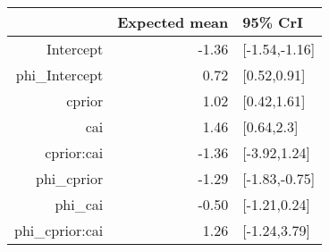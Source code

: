 \begin{tabular}{rrl}
  \hline
 & Expected mean & 95\% CrI \\ 
  \hline
Intercept & -1.36 & [-1.54,-1.16] \\ 
  phi\_Intercept & 0.72 & [0.52,0.91] \\ 
  cprior & 1.02 & [0.42,1.61] \\ 
  cai & 1.46 & [0.64,2.3] \\ 
  cprior:cai & -1.36 & [-3.92,1.24] \\ 
  phi\_cprior & -1.29 & [-1.83,-0.75] \\ 
  phi\_cai & -0.50 & [-1.21,0.24] \\ 
  phi\_cprior:cai & 1.26 & [-1.24,3.79] \\ 
   \hline
\end{tabular}

